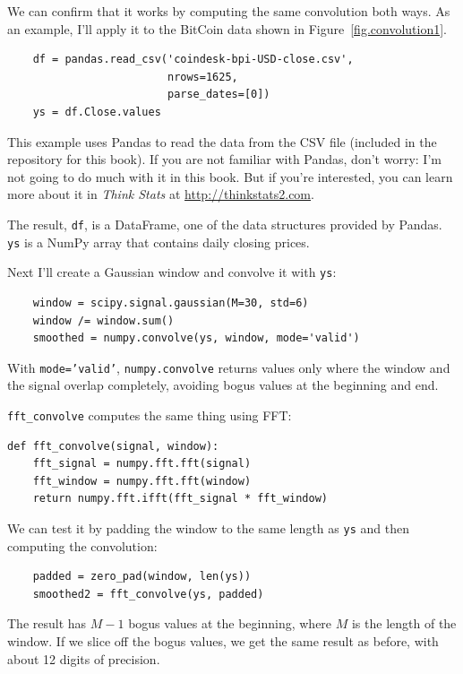 \documentclass[12pt]{book}
\begin{document}
We can confirm that it works by computing the same convolution
both ways.  As an example, I'll apply it to the BitCoin data
shown in Figure~\ref{fig.convolution1}.

\begin{verbatim}
    df = pandas.read_csv('coindesk-bpi-USD-close.csv', 
                         nrows=1625, 
                         parse_dates=[0])
    ys = df.Close.values
\end{verbatim}

This example uses Pandas to read the data from the CSV file (included
in the repository for this book).  If you are not familiar with
Pandas, don't worry: I'm not going to do much with it in this book.
But if you're interested, you can learn more about it in
{\it Think Stats} at \url{http://thinkstats2.com}.

The result, {\tt df}, is a DataFrame, one of the data structures
provided by Pandas.  {\tt ys} is a NumPy array that contains daily
closing prices.

Next I'll create a Gaussian window and convolve it with {\tt ys}:

\begin{verbatim}
    window = scipy.signal.gaussian(M=30, std=6)
    window /= window.sum()
    smoothed = numpy.convolve(ys, window, mode='valid')
\end{verbatim}

With {\tt mode='valid'}, {\tt numpy.convolve} returns values
only where the window and the signal overlap completely, avoiding
bogus values at the beginning and end.

\verb"fft_convolve" computes the same thing using FFT:

\begin{verbatim}
def fft_convolve(signal, window):
    fft_signal = numpy.fft.fft(signal)
    fft_window = numpy.fft.fft(window)
    return numpy.fft.ifft(fft_signal * fft_window)
\end{verbatim}

We can test it by padding the window to the same length
as {\tt ys} and then computing the convolution:

\begin{verbatim}
    padded = zero_pad(window, len(ys))
    smoothed2 = fft_convolve(ys, padded)
\end{verbatim}

The result has $M-1$ bogus values at the beginning, where
$M$ is the length of the window.  If we slice off the bogus
values, we get the same result as before, with about 12 digits
of precision.
\end{document}
